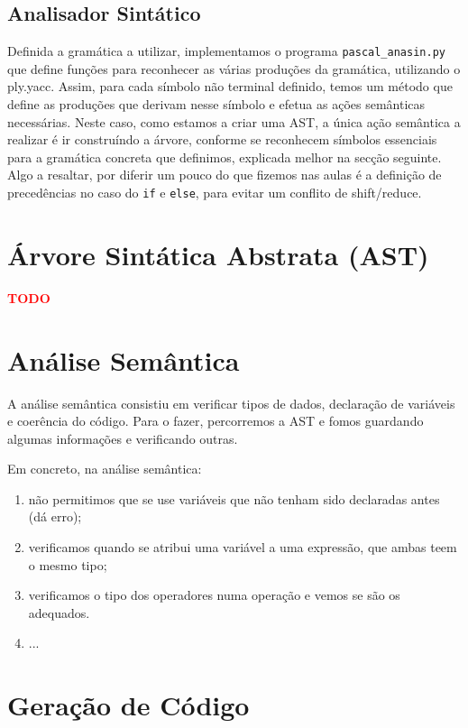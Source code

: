 \documentclass[12pt,a4paper]{report}
\begin{document}
\section{Analisador Sintático}
Definida a gramática a utilizar, implementamos o programa \texttt{pascal\_anasin.py} que define funções para reconhecer as várias produções da gramática, utilizando o ply.yacc.
Assim, para cada símbolo não terminal definido, temos um método que define as produções que derivam nesse símbolo e efetua as ações semânticas necessárias.
Neste caso, como estamos a criar uma AST, a única ação semântica a realizar é ir construíndo a árvore, conforme se reconhecem símbolos essenciais para a gramática concreta que definimos, explicada melhor na secção seguinte.
Algo a resaltar, por diferir um pouco do que fizemos nas aulas é a definição de precedências no caso do \texttt{if} e \texttt{else}, para evitar um conflito de shift/reduce.

\chapter{Árvore Sintática Abstrata (AST)}

\textcolor{red}{\textbf{TODO}}

\chapter{Análise Semântica}

A análise semântica consistiu em verificar tipos de dados, declaração de variáveis e coerência do código. Para o fazer, percorremos a AST e fomos guardando algumas informações
e verificando outras.

Em concreto, na análise semântica:
\begin{enumerate}
    \item não permitimos que se use variáveis que não tenham sido declaradas antes (dá erro);
    \item verificamos quando se atribui uma variável a uma expressão, que ambas teem o mesmo tipo;
    \item verificamos o tipo dos operadores numa operação e vemos se são os adequados.
    \item ...
\end{enumerate}

\chapter{Geração de Código}
\end{document}
